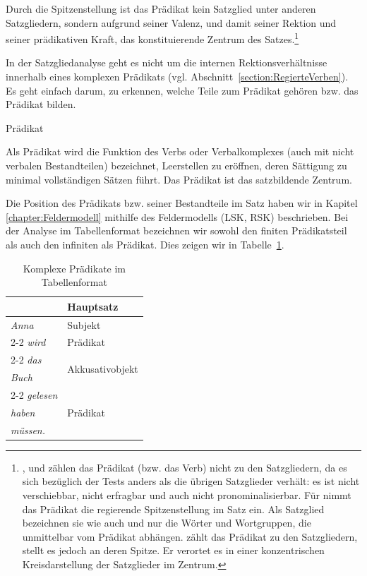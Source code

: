 Durch die Spitzenstellung ist das Prädikat kein Satzglied unter anderen Satzgliedern, sondern aufgrund seiner Valenz, und damit seiner Rektion und seiner prädikativen Kraft, das konstituierende Zentrum des Satzes.\footnote{\citet[71]{Boettcher2009EinfSatz}, \citet[195--204]{Christ2017} und \citet[44]{PittnerBerman2021} zählen das Prädikat (bzw. das Verb) nicht zu den Satzgliedern, da es sich bezüglich der Tests anders als die übrigen Satzglieder verhält: es ist nicht verschiebbar, nicht erfragbar und auch nicht pronominalisierbar. Für \citet[34, 38]{Elst_Habermann_SynAn} nimmt das Prädikat die regierende Spitzenstellung im Satz ein. Als Satzglied bezeichnen sie wie auch \citet[35]{Woellstein_Heilmann_Vikner_2006} und \citet[146]{OehlSeiler2013} nur die Wörter und Wortgruppen, die unmittelbar vom Prädikat abhängen. \citet[45]{Agel2017} zählt das Prädikat zu den Satzgliedern, stellt es jedoch an deren Spitze. Er verortet es in einer konzentrischen Kreisdarstellung der Satzglieder im Zentrum.}

In der Satzgliedanalyse geht es nicht um die internen Rektionsverhältnisse innerhalb eines komplexen Prädikats (vgl. Abschnitt~\ref{section:RegierteVerben}). Es geht einfach darum, zu erkennen, welche Teile zum Prädikat gehören bzw. das Prädikat bilden. 

\begin{Definition}{Prädikat}
    
\noindent Als Prädikat wird die Funktion des Verbs oder Verbalkomplexes (auch mit nicht verbalen Bestandteilen) bezeichnet, Leerstellen zu eröffnen, deren Sättigung zu minimal vollständigen Sätzen führt. Das Prädikat ist das satzbildende Zentrum.    
\end{Definition}

Die Position des Prädikats bzw. seiner Bestandteile im Satz haben wir in Kapitel \ref{chapter:Feldermodell} mithilfe des Feldermodells (LSK, RSK) beschrieben. Bei der Analyse im Tabellenformat bezeichnen wir sowohl den finiten Prädikatsteil als auch den infiniten als Prädikat. Dies zeigen wir in Tabelle~\ref{tab:komplPrädikate}.

\begin{table}
  \centering
  \begin{tabular}{l|l}
      & Hauptsatz \\
    \hline
    \textit{Anna} & Subjekt  \\ \cline{2-2}
    \textit{wird} & Prädikat  \\ \cline{2-2}
    \textit{das} & \multirow{2}{*}{Akkusativobjekt} \\ 
    \textit{Buch} &  \\ \cline{2-2}  
    \textit{gelesen} &  \multirow{3}{*}{Prädikat} \\  
    \textit{haben} &  \\
    \textit{müssen.} &  \\ 
    \hline 
  \end{tabular}
  \caption{Komplexe Prädikate im Tabellenformat}
  \label{tab:komplPrädikate}
\end{table}

